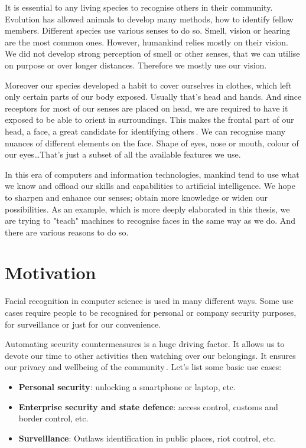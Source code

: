 It is essential to any living species to recognise others in their community. Evolution has allowed animals to develop many methods, how to identify fellow members. Different species use various senses to do so. Smell, vision or hearing are the most common ones. However, humankind relies mostly on their vision. We did not develop strong perception of smell or other senses, that we can utilise on purpose or over longer distances. Therefore we mostly use our vision.

Moreover our species developed a habit to cover ourselves in clothes, which left only certain parts of our body exposed. Usually that's head and hands. And since receptors for most of our senses are placed on head, we are required to have it exposed to be able to orient in surroundings. This makes the frontal part of our head, a face, a great candidate for identifying others\,\cite{history}. We can recognise many nuances of different elements on the face. Shape of eyes, nose or mouth, colour of our eyes\dots That's just a subset of all the available features we use.

In this era of computers and information technologies, mankind tend to use what we know and offload our skills and capabilities to artificial intelligence. We hope to sharpen and enhance our senses; obtain more knowledge or widen our possibilities. As an example, which is more deeply elaborated in this thesis, we are trying to "teach" machines to recognise faces in the same way as we do. And there are various reasons to do so.

\section{Motivation}
Facial recognition in computer science is used in many different ways. Some use cases require people to be recognised for personal or company security purposes, for surveillance or just for our convenience.

Automating security countermeasures is a huge driving factor. It allows us to devote our time to other activities then watching over our belongings. It ensures our privacy and wellbeing of the community\,\cite{viola2004robust}. Let's list some basic use cases:

\begin{itemize}
    \item \textbf{Personal security}: unlocking a smartphone or laptop, etc.
    \item \textbf{Enterprise security and state defence}: access control, customs and border control, etc.
    \item \textbf{Surveillance}: Outlaws identification in public places, riot control, etc.
\end{itemize}

